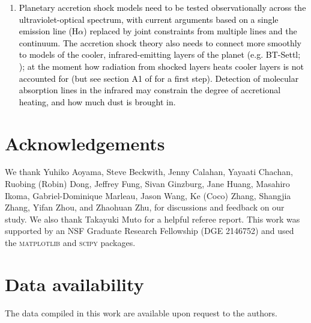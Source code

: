 \documentclass[fleqn,usenatbib]{mnras}
\newcommand{\nick}[1]{\textcolor{black}{ #1}}
\begin{document}
\begin{enumerate}
\item \nick{Planetary accretion shock models \citep{aoyama_etal_2020, aoyama_etal_2021} need to be tested observationally across the ultraviolet-optical spectrum, with current arguments based on a single emission line (H$\alpha$) replaced by joint constraints from multiple lines and the continuum. The accretion shock theory also needs to connect more smoothly to models of the cooler, infrared-emitting layers of the planet (e.g. BT-Settl; \citealt{baraffe_etal_2015}); at the moment how radiation from shocked layers heats cooler layers is not accounted for (but see section A1 of \citealt{aoyama_etal_2020} for a first step). Detection of molecular absorption lines in the infrared \citep{cugno_etal_2021, wang_etal_2021} may constrain the degree of accretional heating, and how much dust is brought in. }


\end{enumerate}




\section*{Acknowledgements}
We thank Yuhiko Aoyama, Steve Beckwith, Jenny Calahan, Yayaati Chachan, Ruobing (Robin) Dong, Jeffrey Fung, Sivan Ginzburg, Jane Huang, Masahiro Ikoma, Gabriel-Dominique Marleau, Jason Wang, Ke (Coco) Zhang, Shangjia Zhang, Yifan Zhou, and Zhaohuan Zhu, for discussions and feedback on our study. We also thank Takayuki Muto for a helpful referee report. This work was supported by an NSF Graduate Research Fellowship (DGE 2146752) and used the \textsc{matplotlib} \citep{hunter_etal_2007} and \textsc{scipy} \citep{scipy_2020} packages.

\section*{Data availability}
The data compiled in this work are available upon request to the authors.






 









\bsp	%
\label{lastpage}
\end{document}

